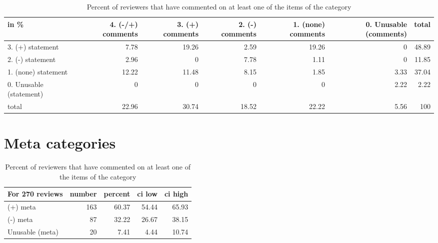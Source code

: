 \documentclass{article}
\begin{document}
\begin{table}[H]

\centering

\begin{tabular}{lrrrrrr}
\hline
 in \%                    &   4. (-/+) comments &   3. (+) comments &   2. (-) comments &   1. (none) comments &   0. Unusable (comments) &   total \\
\hline
 3. (+) statement        &                7.78 &             19.26 &              2.59 &                19.26 &                     0    &   48.89 \\
 2. (-) statement        &                2.96 &              0    &              7.78 &                 1.11 &                     0    &   11.85 \\
 1. (none) statement     &               12.22 &             11.48 &              8.15 &                 1.85 &                     3.33 &   37.04 \\
 0. Unusable (statement) &                0    &              0    &              0    &                 0    &                     2.22 &    2.22 \\
 total                   &               22.96 &             30.74 &             18.52 &                22.22 &                     5.56 &  100    \\
\hline
\end{tabular}\caption{Percent of reviewers that have commented on at least one of the items of the category}

\end{table}



\section{Meta categories} 

\begin{table}[H]

\centering

\begin{tabular}{lrrrr}
\hline
 For 270 reviews   &   number &   percent &   ci low &   ci high \\
\hline
 (+) meta          &      163 &     60.37 &    54.44 &     65.93 \\
 (-) meta          &       87 &     32.22 &    26.67 &     38.15 \\
 Unusable (meta)   &       20 &      7.41 &     4.44 &     10.74 \\
\hline
\end{tabular}\caption{Percent of reviewers that have commented on at least one of the items of the category}

\end{table}
\end{document}

